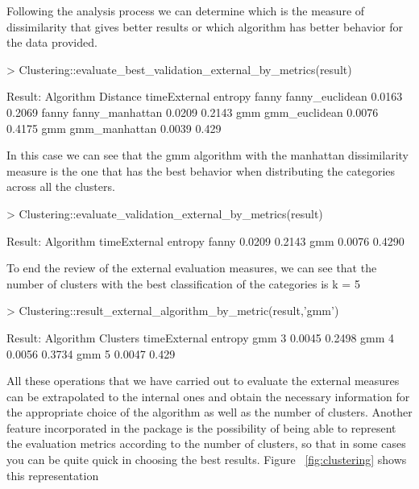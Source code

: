 Following the analysis process we can determine which is the measure of dissimilarity that gives better results or which algorithm has better behavior for the data provided.

\begin{Schunk}
\begin{Sinput}
> Clustering::evaluate_best_validation_external_by_metrics(result)
\end{Sinput}
\begin{Soutput}
Result:
Algorithm     Distance      timeExternal entropy
 fanny     fanny_euclidean      0.0163   0.2069
 fanny     fanny_manhattan      0.0209   0.2143
  gmm       gmm_euclidean       0.0076   0.4175
  gmm       gmm_manhattan       0.0039   0.429
\end{Soutput}
\end{Schunk}
In this case we can see that the gmm algorithm with the manhattan dissimilarity measure is the one that has the best behavior when distributing the categories across all the clusters.

\begin{Schunk}
\begin{Sinput}
> Clustering::evaluate_validation_external_by_metrics(result)
\end{Sinput}
\begin{Soutput}
Result:
  Algorithm timeExternal entropy
    fanny     0.0209     0.2143
    gmm       0.0076     0.4290
\end{Soutput}
\end{Schunk}


To end the review of the external evaluation measures, we can see that the number of clusters with the best classification of the categories is k = 5

\begin{Schunk}
\begin{Sinput}
> Clustering::result_external_algorithm_by_metric(result,'gmm')
\end{Sinput}
\begin{Soutput}
Result:
Algorithm Clusters timeExternal entropy
    gmm      3       0.0045      0.2498
    gmm      4       0.0056      0.3734
    gmm      5       0.0047      0.429
\end{Soutput}
\end{Schunk}

All these operations that we have carried out to evaluate the external measures can be extrapolated to the internal ones and obtain the necessary information for the appropriate choice of the algorithm as well as the number of clusters. Another feature incorporated in the package is the possibility of being able to represent the evaluation metrics according to the number of clusters, so that in some cases you can be quite quick in choosing the best results. Figure ~\ref{fig:clustering} shows this representation

